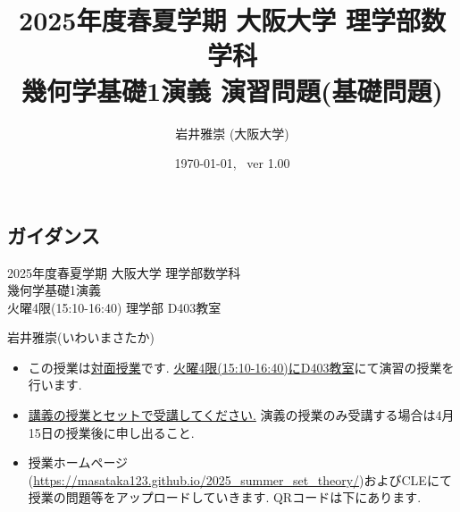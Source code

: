 \documentclass[dvipdfmx,a4paper,11pt]{article}
\title{2025年度春夏学期 大阪大学 理学部数学科 \\ 幾何学基礎1演義 演習問題(基礎問題)}
\author{岩井雅崇 (大阪大学)}
\date{\today, \, ver 1.00}
\theoremstyle{definition}
\begin{document}
\maketitle
\tableofcontents
\newpage

\begin{center}
\setcounter{section}{-1}
\section{ガイダンス}
\label{sec-guide}
\end{center}

\begin{center}
{\Large 2025年度春夏学期 大阪大学 理学部数学科 \\ 幾何学基礎1演義} \\
火曜4限(15:10-16:40) 理学部 D403教室
\end{center}
\begin{flushright}
 岩井雅崇(いわいまさたか) \\
\end{flushright}

\begin{itemize}
  \setlength{\parskip}{0cm} %
  \setlength{\itemsep}{0cm} %
\item この授業は\underline{対面授業}です. \underline{火曜4限(15:10-16:40)にD403教室}にて演習の授業を行います.
\item \underline{講義の授業とセットで受講してください.} 演義の授業のみ受講する場合は4月15日の授業後に申し出ること. 
\item 授業ホームページ(\url{https://masataka123.github.io/2025_summer_set_theory/})およびCLEにて授業の問題等をアップロードしていきます. 
QRコードは下にあります. 
\end{itemize}
\end{document}
